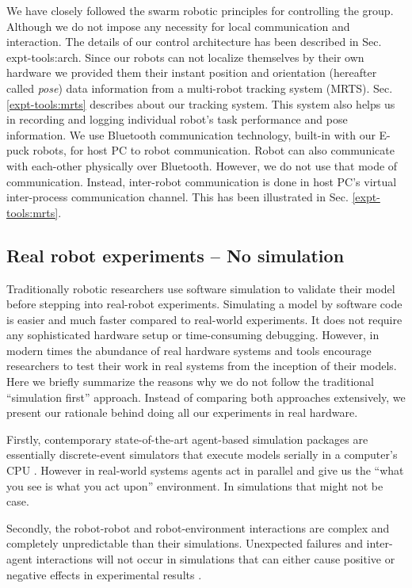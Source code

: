 We have closely followed the swarm robotic principles for controlling the group. Although we do not impose any necessity for local communication and interaction. The details of our control architecture has been described in Sec. {expt-tools:arch}. Since our robots can not localize themselves by their own hardware we  provided them their instant position and orientation (hereafter called {\em pose}) data information from a multi-robot tracking system (MRTS). Sec. \ref{expt-tools:mrts} describes about our tracking system.  This system also helps us in recording and logging  individual robot's task performance and pose information. We use Bluetooth communication technology, built-in with our E-puck robots, for host PC to robot communication. Robot can also communicate with each-other physically over Bluetooth. However, we do not use that mode of communication. Instead, inter-robot communication is done in host PC's virtual inter-process communication channel. This has been illustrated in Sec. \ref{expt-tools:mrts}.
\subsection{Real robot experiments -- No simulation}
Traditionally robotic researchers use software simulation to validate their model before stepping into real-robot experiments. Simulating a model by software code is easier and much faster compared to real-world experiments. It does not require any sophisticated hardware setup or time-consuming debugging. However, in modern times the abundance of real hardware systems and tools encourage researchers to test their work in real systems from the inception of their models. Here we briefly summarize the reasons why we do not follow the traditional  ``simulation first'' approach. Instead of comparing both approaches extensively, we present our rationale behind doing all our experiments in real hardware.
 
Firstly, contemporary  state-of-the-art agent-based simulation packages are essentially discrete-event simulators that execute models serially in a computer's CPU \cite{Lysenko+2008}. However in real-world systems agents act in parallel and give us the ``what you see is what you act upon''  environment. In simulations that might not be case.

Secondly, the robot-robot and robot-environment interactions are complex and completely unpredictable than their simulations. Unexpected failures and inter-agent interactions will not occur in simulations that can either cause positive or negative effects in experimental results \cite{Krieger+2000}.

